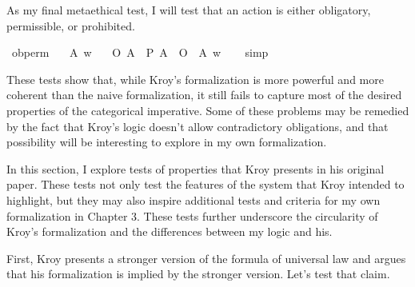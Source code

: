 \begin{isabellebody}
\begin{isamarkuptext}
      As my final metaethical test, I will test that an action is either obligatory, permissible, or 
      prohibited.%
\end{isamarkuptext}\isamarkuptrue%
\isamarkupfalse%
\ ob{\isacharunderscore}perm{\isacharcolon}\isanewline
\ \ \ A\ w\isanewline
\ \ \ {\isachardoublequoteopen}{\isacharparenleft}O\ {\isacharbraceleft}A{\isacharbraceright}\ \isactrlbold {\isasymor}\ {\isacharparenleft}P\ {\isacharbraceleft}A{\isacharbraceright}\ \isactrlbold {\isasymor}\ O\ {\isacharbraceleft}\isactrlbold {\isasymnot}\ A{\isacharbraceright}{\isacharparenright}{\isacharparenright}\ w{\isachardoublequoteclose}\isanewline
%
\isadelimproof
\ \ %
\endisadelimproof
%
\isatagproof
{}\isamarkupfalse%
\ simp\isanewline
%
%
\endisatagproof
{\isafoldproof}%
%
\isadelimproof
%
\endisadelimproof
%
\begin{isamarkuptext}%
These tests show that, while Kroy's formalization is more powerful and more coherent than the naive formalization, it 
      still fails to capture most of the desired properties of the categorical imperative. Some of these 
      problems may be remedied by the fact that Kroy's logic doesn't allow contradictory obligations, 
      and that possibility will be interesting to explore in my own formalization.%
\end{isamarkuptext}\isamarkuptrue%
%
\isadelimdocument
%
\endisadelimdocument
%
\isatagdocument
%
\isamarkuptrue%
%
\endisatagdocument
{\isafolddocument}%
%
\isadelimdocument
%
\endisadelimdocument
%
\begin{isamarkuptext}%
In this section, I explore tests of properties that Kroy presents in his original paper. These 
tests not only test the features of the system that Kroy intended to highlight, but they may also 
inspire additional tests and criteria for my own formalization in Chapter 3. These tests further underscore 
the circularity of Kroy's formalization and the differences between my logic and his.%
\end{isamarkuptext}\isamarkuptrue%
%
\begin{isamarkuptext}%
First, Kroy presents a stronger version of the formula of universal law and argues that his formalization
is implied by the stronger version. Let's test that claim.%
\end{isamarkuptext}\isamarkuptrue%
\isamarkupfalse%

\end{isabellebody}
